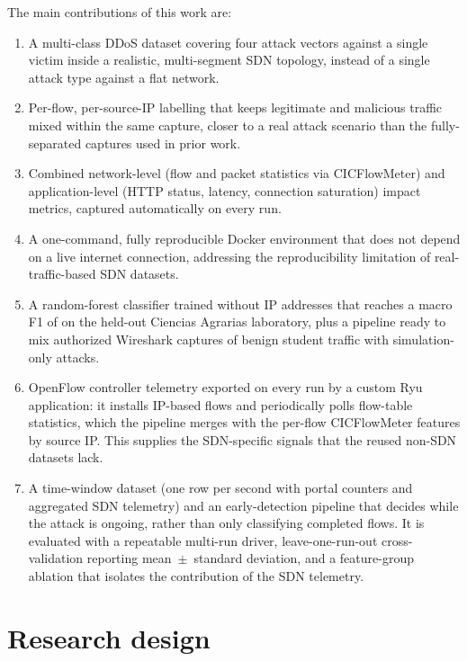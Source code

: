 \documentclass[ASNA,twocolumn]{USG}
\begin{document}
The main contributions of this work are:
\begin{enumerate}[label=\roman*.]
  \item A multi-class DDoS dataset covering four attack vectors
        against a single victim inside a realistic, multi-segment SDN
        topology, instead of a single attack type against a flat
        network.
  \item Per-flow, per-source-IP labelling that keeps legitimate and
        malicious traffic mixed within the same capture, closer to a
        real attack scenario than the fully-separated captures used
        in prior work.
  \item Combined network-level (flow and packet statistics via
        CICFlowMeter) and application-level (HTTP status, latency,
        connection saturation) impact metrics, captured automatically
        on every run.
  \item A one-command, fully reproducible Docker environment that
        does not depend on a live internet connection, addressing the
        reproducibility limitation of real-traffic-based SDN
        datasets.
  \item A random-forest classifier trained without IP addresses that
        reaches a macro F1 of \Fmacro on the held-out Ciencias
        Agrarias laboratory, plus a pipeline ready to mix authorized
        Wireshark captures of benign student traffic with
        simulation-only attacks.
  \item OpenFlow controller telemetry exported on every run by a custom
        Ryu application: it installs IP-based flows and periodically
        polls flow-table statistics, which the pipeline merges with the
        per-flow CICFlowMeter features by source IP. This supplies the
        SDN-specific signals that the reused non-SDN datasets lack.
  \item A time-window dataset (one row per second with portal counters
        and aggregated SDN telemetry) and an early-detection pipeline
        that decides while the attack is ongoing, rather than only
        classifying completed flows. It is evaluated with a repeatable
        multi-run driver, leave-one-run-out cross-validation reporting
        mean~$\pm$~standard deviation, and a feature-group ablation that
        isolates the contribution of the SDN telemetry.
\end{enumerate}

\section{Research design}\label{sec:research}
\end{document}
